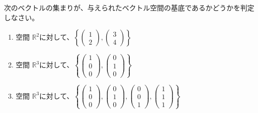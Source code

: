 \begin{quiz}
次のベクトルの集まりが、与えられたベクトル空間の基底であるかどうかを判定しなさい。
\begin{enumerate}
\item 空間 $\mathbb{R}^2$に対して、$\left\{ \begin{pmatrix} 1 \\ 2 \end{pmatrix}, \begin{pmatrix} 3 \\ 4 \end{pmatrix} \right\}$
\item 空間 $\mathbb{R}^3$に対して、$\left\{ \begin{pmatrix} 1 \\ 0 \\ 0 \end{pmatrix}, \begin{pmatrix} 0 \\ 1 \\ 0 \end{pmatrix} \right\}$
\item 空間 $\mathbb{R}^3$に対して、$\left\{ \begin{pmatrix} 1 \\ 0 \\ 0 \end{pmatrix}, \begin{pmatrix} 0 \\ 1 \\ 0 \end{pmatrix}, \begin{pmatrix} 0 \\ 0 \\ 1 \end{pmatrix}, \begin{pmatrix} 1 \\ 1 \\ 1 \end{pmatrix} \right\}$
\end{enumerate}
\end{quiz}

